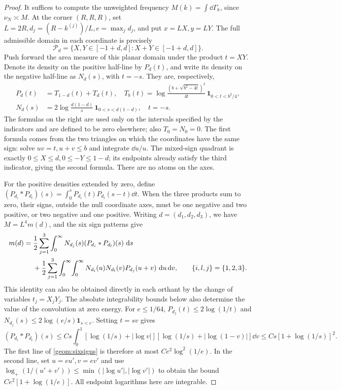 \begin{proof}
It suffices to compute the unweighted frequency $M(k)=\int\dd\Gamma_k$,
since $\nu_N\asymp M$. At the corner $(R,R,R)$, set
$L=2R,d_j=(R-k^{(j)})/L,e=\max_jd_j$, and put $x=L X,y=L Y$.
The full admissible domain in each coordinate is precisely
\[
 \mathcal P_d=\{X,Y\in[-1+d,d]:X+Y\in[-1+d,d]\}.
\]
Push forward the area measure of this planar domain under the product
$t=XY$. Denote its density on the positive half-line by $P_d(t)$,
and write its density on the negative half-line as $N_d(s)$, with $t=-s$.
They are, respectively,
\begin{align}
 P_d(t)&=T_{1-d}(t)+T_d(t),\quad
 T_b(t)=\log\frac{(b+\sqrt{b^2-4t})^2}{4t}\,
                  \mathbf1_{0<t<b^2/4},\label{geom:productpositive}\\
 N_d(s)&=2\log\frac{d(1-d)}s\,
                  \mathbf1_{0<s<d(1-d)},\quad t=-s.\label{geom:productnegative}
\end{align}
The formulas on the right are used only on the intervals specified by
the indicators and are defined to be zero elsewhere; also $T_0=N_0=0$.
The first formula comes from the two triangles on which the coordinates
have the same sign: solve $uv=t,u+v\le b$ and integrate $\dd u/u$.
The mixed-sign quadrant is exactly
$0\le X\le d,0\le-Y\le1-d$; its endpoints already satisfy the third
indicator, giving the second formula. There are no atoms on the axes.

For the positive densities extended by zero, define
$(P_{d_i}*P_{d_l})(s)=\int_0^sP_{d_i}(t)P_{d_l}(s-t)\dd t$.
When the three products sum to zero, their signs, outside the null
coordinate axes, must be one negative and two positive, or two negative
and one positive. Writing $d=(d_1,d_2,d_3)$, we have $M=L^4m(d)$,
and the six sign patterns give
\begin{align}
 m(d)={}&\frac12\sum_{j=1}^3\int_0^\infty
           N_{d_j}(s)(P_{d_i}*P_{d_l})(s)\,\,\mathrm d s\notag\\
 &+\frac12\sum_{j=1}^3\int_0^\infty\!\int_0^\infty
       N_{d_i}(u)N_{d_l}(v)P_{d_j}(u+v)\,\,\mathrm d u\,\mathrm d v,
       \qquad\{i,l,j\}=\{1,2,3\}.\label{geom:sixsigns}
\end{align}
This identity can also be obtained directly in each orthant by the change
of variables $t_j=X_jY_j$. The absolute integrability bounds below
also determine the value of the convolution at zero energy.
For $e\le1/64$,
$P_{d_j}(t)\le2\log(1/t)$ and
$N_{d_j}(s)\le2\log(e/s)\mathbf1_{s<e}$.
Setting $t=sv$ gives
\[
 (P_{d_i}*P_{d_l})(s)
 \le Cs\int_0^1[\log(1/s)+|\log v|]
                    [\log(1/s)+|\log(1-v)|]\dd v
 \le Cs[1+\log(1/s)]^2.
\]
The first line of \eqref{geom:sixsigns} is therefore at most
$Ce^2\log^2(1/e)$. In the second line, set $u=eu',v=ev'$ and use
$\log_+(1/(u'+v'))\le\min(|\log u'|,|\log v'|)$
to obtain the bound $Ce^2[1+\log(1/e)]$.
All endpoint logarithms here are integrable.


\end{proof}
